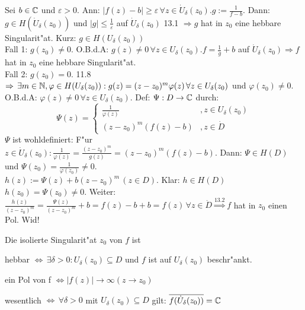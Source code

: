\documentclass[a4paper,twoside,DIV15,BCOR12mm]{scrbook}
\begin{document}
\begin{beweis}
Sei $b \in \mathbb{C}$ und $\varepsilon > 0.$ Ann: $|f(z) - b | \geq \varepsilon \, \forall z \in \dot{U}_{\delta}(z_0). g:= \frac1{f-b}.$ Dann: $g \in H(\dot{U}_{\delta}(z_0))$ und $|g| \leq \frac1{\varepsilon}$ auf $\dot{U}_{\delta}(z_0)$ 13.1 $\Rightarrow g$ hat in $z_0$ eine hebbare Singularit"at. Kurz: $g \in H (U_{\delta}(z_0))$\\
Fall 1: $g(z_0) \not= 0.$ O.B.d.A: $g(z) \not= 0 \, \forall z \in U_{\delta}(z_0). f = \frac1g+b$ auf $\dot{U}_{\delta}(z_0) \Rightarrow f$ hat in $z_0$ eine hebbare Singularit"at.\\
Fall 2: $g(z_0) = 0.$ 11.8 $\Rightarrow \, \exists m \in \mathbb{N}, \varphi \in H(U_{\delta}(z_0)): g(z) = (z-z_0)^m \varphi(z) \, \forall z \in U_{\delta}(z_0)$ und $\varphi(z_0) \not= 0$. O.B.d.A: $\varphi(z) \not= 0 \, \forall z \in U_{\delta}(z_0).$ Def: $\Psi: D \rightarrow \mathbb{C}$ durch:
\[
\Psi(z) = \begin{cases}
\frac1{\varphi(z)} &, z \in U_{\delta}(z_0)\\
(z-z_0)^m(f(z)-b) &,z \in \dot{D}
\end{cases}
\]
$\Psi$ ist wohldefiniert: F"ur $z \in \dot{U}_{\delta}(z_0): \frac1{\varphi(z)} = \frac{(z-z_0)^m}{g(z)} = (z-z_0)^m (f(z)-b)$.
Dann: $\Psi \in H(D)$ und $\Psi(z_0) = \frac1{\varphi(z_0)} \not= 0.$\\
$h(z) := \Psi(z) + b(z-z_0)^m \, (z \in D).$ Klar: $h \in H(D)$\\
$h(z_0) = \Psi(z_0) \not= 0$.
Weiter: $\frac{h(z)}{(z-z_0)^m} = \frac{\Psi(z)}{(z-z_0)^m}+b = f(z) - b + b = f(z) \, \forall z \in \dot{D} \stackrel{13.2}{\Rightarrow} f$ hat in $z_0$ einen Pol. Wid!
\end{beweis}

\begin{satz}[Klassifikation]
Die isolierte Singularit"at $z_0$ von $f$ ist
\begin{liste}
\item hebbar $\Leftrightarrow \, \exists \delta > 0 : U_{\delta}(z_0) \subseteq D$ und $f$ ist auf $U_{\delta}(z_0)$ beschr"ankt.
\item ein Pol von f $\Leftrightarrow |f(z)| \rightarrow \infty (z \rightarrow z_0)$
\item wesentlich $\Leftrightarrow \, \forall \delta > 0$ mit $U_{\delta}(z_0) \subseteq D$ gilt: $\overline{f(\dot{U}_{\delta}(z_0))} = \mathbb{C}$
\end{liste}
\end{satz}
\end{document}
